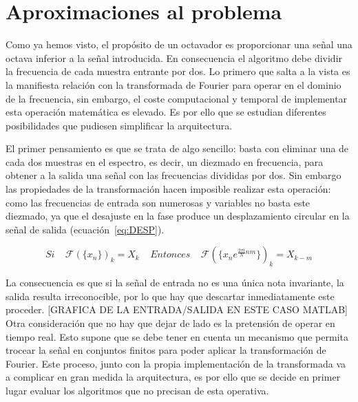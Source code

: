 \section{Aproximaciones al problema}
Como ya hemos visto, el propósito de un octavador es proporcionar una señal una octava inferior a la señal introducida. En consecuencia el algoritmo debe dividir la frecuencia de cada muestra entrante por dos. Lo primero que salta a la vista es la manifiesta relación con la transformada de Fourier para operar en el dominio de la frecuencia, sin embargo, el coste computacional y temporal de implementar esta operación matemática es elevado. Es por ello que se estudian diferentes posibilidades que pudiesen simplificar la arquitectura.

El primer pensamiento es que se trata de algo sencillo: basta con eliminar una de cada dos muestras en el espectro, es decir, un diezmado en frecuencia, para obtener a la salida una señal con las frecuencias divididas por dos. Sin embargo las propiedades de la transformación hacen imposible realizar esta operación: como las frecuencias de entrada son numerosas y variables no basta este diezmado, ya que el desajuste en la fase produce un desplazamiento circular en la señal de salida (ecuación~\ref{eq:DESP}). 

\begin{equation}
\label{eq:DESP}
Si~~~~~\mathscr{F}(\{x_{n}\})_{k} = X_{k}~~~~~Entonces~~~~~\mathscr{F}(\{x_{n}e^{\frac{2\pi i}{N}nm}\})_{k}= X_{k-m} 
\end{equation}

La consecuencia es que si la señal de entrada no es una única nota invariante, la salida resulta irreconocible, por lo que  hay que descartar inmediatamente este proceder. [GRAFICA DE LA ENTRADA/SALIDA EN ESTE CASO MATLAB] Otra consideración que no hay que dejar de lado es la pretensión de operar en tiempo real. Esto supone que se debe tener en cuenta un mecanismo que permita trocear la señal en conjuntos finitos para poder aplicar la transformación de Fourier. Este proceso, junto con la propia implementación de la transformada va a complicar en gran medida la arquitectura, es por ello que se decide en primer lugar evaluar los algoritmos que no precisan de esta operativa.

